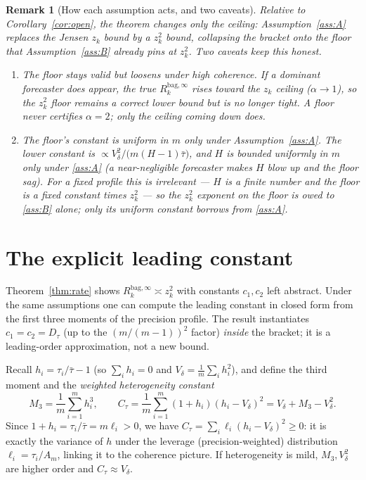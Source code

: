 \documentclass[11pt]{article}
\newcommand{\Rk}{R_k^{\mathrm{bag},\infty}}
\newtheorem{remark}{Remark}
\begin{document}
\begin{remark}[How each assumption acts, and two caveats]\label{rem:caveats}
Relative to Corollary~\ref{cor:open}, the theorem changes \emph{only the ceiling}:
Assumption~\ref{ass:A} replaces the Jensen $z_k$ bound by a $z_k^2$ bound, collapsing the
bracket onto the floor that Assumption~\ref{ass:B} already pins at $z_k^2$. Two caveats
keep this honest.
\begin{enumerate}
\item \emph{The floor stays valid but loosens under high coherence.} If a dominant
forecaster does appear, the true $\Rk$ rises toward the $z_k$ ceiling ($\alpha\to1$), so
the $z_k^2$ floor remains a correct lower bound but is no longer tight. A floor never
certifies $\alpha=2$; only the ceiling coming down does.
\item \emph{The floor's constant is uniform in $m$ only under Assumption~\ref{ass:A}.}
The lower constant is $\propto V_\delta^2/\big(m(H-1)\bar\tau\big)$, and $H$ is bounded
uniformly in $m$ only under \ref{ass:A} (a near-negligible forecaster makes $H$ blow up
and the floor sag). For a fixed profile this is irrelevant --- $H$ is a finite number and
the floor is a fixed constant times $z_k^2$ --- so the $z_k^2$ \emph{exponent} on the
floor is owed to \ref{ass:B} alone; only its uniform constant borrows from \ref{ass:A}.
\end{enumerate}
\end{remark}

\section{The explicit leading constant}\label{sec:constant}
Theorem~\ref{thm:rate} shows $\Rk\asymp z_k^2$ with constants $c_1,c_2$ left abstract.
Under the same assumptions one can compute the leading constant in closed form from the
first three moments of the precision profile. The result instantiates $c_1=c_2=D_\tau$
(up to the $(m/(m-1))^2$ factor) \emph{inside} the bracket; it is a leading-order
approximation, not a new bound.

Recall $h_i=\tau_i/\bar\tau-1$ (so $\sum_ih_i=0$ and $V_\delta=\frac1m\sum_ih_i^2$), and
define the third moment and the \emph{weighted heterogeneity constant}
\[
  M_3=\frac1m\sum_{i=1}^m h_i^3,\qquad
  C_\tau=\frac1m\sum_{i=1}^m(1+h_i)(h_i-V_\delta)^2=V_\delta+M_3-V_\delta^2 .
\]
Since $1+h_i=\tau_i/\bar\tau=m\ell_i>0$, we have $C_\tau=\sum_i\ell_i(h_i-V_\delta)^2\ge0$:
it is exactly the variance of $h$ under the leverage (precision-weighted) distribution
$\ell_i=\tau_i/A_m$, linking it to the coherence picture. If heterogeneity is mild,
$M_3,V_\delta^2$ are higher order and $C_\tau\approx V_\delta$.
\end{document}
